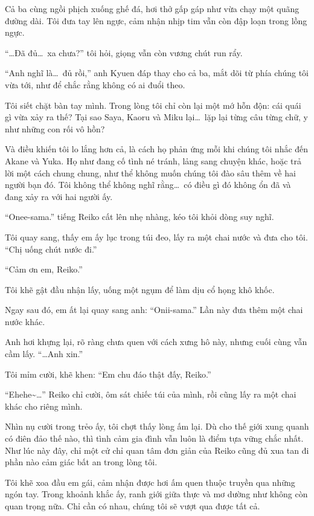 \documentclass[../main.tex]{subfiles}
\begin{document}
Cả ba cùng ngồi phịch xuống ghế đá, hơi thở gấp gáp như vừa chạy một quãng đường dài. Tôi đưa tay lên ngực, cảm nhận nhịp tim vẫn còn đập loạn trong lồng ngực.

``\dots Đã đủ\dots\ xa chưa?'' tôi hỏi, giọng vẫn còn vương chút run rẩy.

``Anh nghĩ là\dots\ đủ rồi,'' anh Kyuen đáp thay cho cả ba, mắt dõi từ phía chúng tôi vừa tới, như để chắc rằng không có ai đuổi theo.

Tôi siết chặt bàn tay mình. Trong lòng tôi chỉ còn lại một mớ hỗn độn: cái quái gì vừa xảy ra thế? Tại sao Saya, Kaoru và Miku lại\dots\ lặp lại từng câu từng chữ, y như những con rối vô hồn?

Và điều khiến tôi lo lắng hơn cả, là cách họ phản ứng mỗi khi chúng tôi nhắc đến Akane và Yuka. Họ như đang cố tình né tránh, lảng sang chuyện khác, hoặc trả lời một cách chung chung, như thể không muốn chúng tôi đào sâu thêm về hai người bạn đó. Tôi không thể không nghĩ rằng\dots\ có điều gì đó không ổn đã và đang xảy ra với hai người ấy.

``Onee-sama.'' tiếng Reiko cất lên nhẹ nhàng, kéo tôi khỏi dòng suy nghĩ.

Tôi quay sang, thấy em ấy lục trong túi đeo, lấy ra một chai nước và đưa cho tôi. ``Chị uống chút nước đi.''

``Cảm ơn em, Reiko.''

Tôi khẽ gật đầu nhận lấy, uống một ngụm để làm dịu cổ họng khô khốc.

Ngay sau đó, em ất lại quay sang anh: ``Onii-sama.'' Lần này đưa thêm một chai nước khác.

Anh hơi khựng lại, rõ ràng chưa quen với cách xưng hô này, nhưng cuối cùng vẫn cầm lấy. ``\dots Anh xin.''

Tôi mỉm cười, khẽ khen: ``Em chu đáo thật đấy, Reiko.''

``Ehehe\~{}\dots'' Reiko chỉ cười, ôm sát chiếc túi của mình, rồi cũng lấy ra một chai khác cho riêng mình.

Nhìn nụ cười trong trẻo ấy, tôi chợt thấy lòng ấm lại. Dù cho thế giới xung quanh có điên đảo thế nào, thì tình cảm gia đình vẫn luôn là điểm tựa vững chắc nhất. Như lúc này đây, chỉ một cử chỉ quan tâm đơn giản của Reiko cũng đủ xua tan đi phần nào cảm giác bất an trong lòng tôi.

Tôi khẽ xoa đầu em gái, cảm nhận được hơi ấm quen thuộc truyền qua những ngón tay. Trong khoảnh khắc ấy, ranh giới giữa thực và mơ dường như không còn quan trọng nữa. Chỉ cần có nhau, chúng tôi sẽ vượt qua được tất cả.
\end{document}
